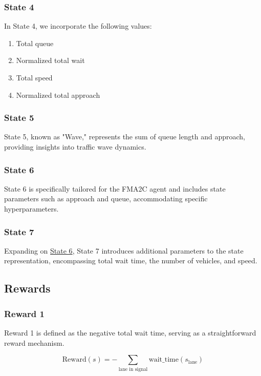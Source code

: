 \subsubsection{State 4} \label{subsec:state-4}
In State 4, we incorporate the following values:
\begin{enumerate}
    \item Total queue
    \item Normalized total wait
    \item Total speed
    \item Normalized total approach
\end{enumerate}

\subsubsection{State 5} \label{subsec:state-5}
State 5, known as "Wave," represents the sum of queue length and approach, providing insights into traffic wave dynamics.

\subsubsection{State 6} \label{subsec:state-6}
State 6 is specifically tailored for the FMA2C agent and includes state parameters such as approach and queue, accommodating specific hyperparameters.

\subsubsection{State 7} \label{subsec:state-7}
Expanding on \hyperref[subsec:state-6]{State 6}, State 7 introduces additional parameters to the state representation, encompassing total wait time, the number of vehicles, and speed.

\subsection{Rewards}
\subsubsection{Reward 1} \label{subsec:reward-1}
Reward 1 is defined as the negative total wait time, serving as a straightforward reward mechanism.

\begin{equation}
    \text{Reward}(s) = -\sum_{\text{lane in signal}} \text{wait\_time}(s_{\text{lane}})
\end{equation}

